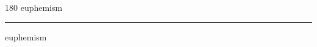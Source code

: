 
\begin{frame}
\begin{center}
\begin{turn}{180}
{\fontsize{2.5cm}{1em}\selectfont euphemism}
\end{turn}
\vspace{1em}\par  
\hrule
\vspace{1em}\par  
{\fontsize{2.5cm}{1em}\selectfont euphemism}
\end{center}
\end{frame}
